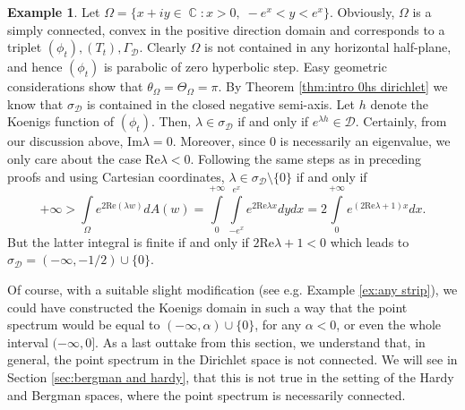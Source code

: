 \documentclass[11pt]{amsart}
\numberwithin{equation}{section}
\theoremstyle{definition}
\newtheorem{example}[theorem]{Example}
\DeclareMathOperator{\C}{\mathbb{C}}
\begin{document}
	\begin{example}\label{ex:not connected}
		Let $\Omega=\{x+iy\in\C:x>0,\;-e^x<y<e^x\}$. Obviously, $\Omega$ is a simply connected, convex in the positive direction domain and corresponds to a triplet $(\phi_t), (T_t), \Gamma_\mathcal{D}$. Clearly $\Omega$ is not contained in any horizontal half-plane, and hence $(\phi_t)$ is parabolic of zero hyperbolic step. Easy geometric considerations show that $\theta_\Omega=\Theta_\Omega=\pi$. By Theorem \ref{thm:intro 0hs dirichlet} we know that $\sigma_\mathcal{D}$ is contained in the closed negative semi-axis. Let $h$ denote the Koenigs function of $(\phi_t)$. Then, $\lambda\in\sigma_\mathcal{D}$ if and only if $e^{\lambda h}\in\mathcal{D}$. Certainly, from our discussion above, $\mathrm{Im}\lambda=0$. Moreover, since $0$ is necessarily an eigenvalue, we only care about the case $\mathrm{Re}\lambda<0$. Following the same steps as in preceding proofs and using Cartesian coordinates, $\lambda\in\sigma_\mathcal{D}\setminus\{0\}$ if and only if
		\begin{equation*}
			+\infty>\int\limits_{\Omega}e^{2\mathrm{Re}(\lambda w)}dA(w)=\int\limits_{0}^{+\infty}\int\limits_{-e^x}^{e^x}e^{2\mathrm{Re}\lambda x}dydx
			=2\int\limits_{0}^{+\infty}e^{(2\mathrm{Re}\lambda+1)x}dx.
		\end{equation*}
		But the latter integral is finite if and only if $2\mathrm{Re}\lambda+1<0$ which leads to $\sigma_\mathcal{D}=(-\infty,-1/2)\cup\{0\}$.
	\end{example}
	
	Of course, with a suitable slight modification (see e.g. Example \ref{ex:any strip}), we could have constructed the Koenigs domain in such a way that the point spectrum would be equal to $(-\infty,\alpha)\cup\{0\}$, for any $\alpha<0$, or even the whole interval $(-\infty,0]$. As a last outtake from this section, we understand that, in general, the point spectrum in the Dirichlet space is not connected. We will see in Section \ref{sec:bergman and hardy}, that this is not true in the setting of the Hardy and Bergman spaces, where the point spectrum is necessarily connected.
	
	
\end{document}
